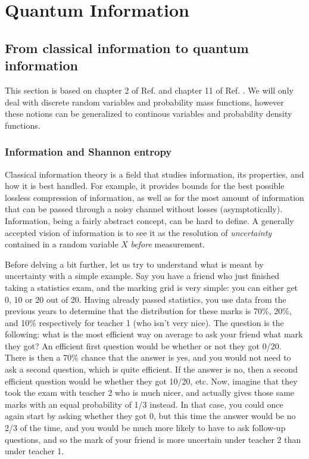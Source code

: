 \chapter{Quantum Information}

\section{From classical information to quantum information} \label{sec:classical_information}

This section is based on chapter 2 of Ref. \cite{cover_elements_2006} and chapter 11 of Ref. \cite{nielsen_quantum_2010}. We will only deal with discrete random variables and probability mass functions, however these notions can be generalized to continous variables and probability density functions.

\subsection{Information and Shannon entropy}

Classical information theory is a field that studies information, its properties, and how it is best handled. For example, it provides bounds for the best possible lossless compression of information, as well as for the most amount of information that can be passed through a noisy channel without losses (asymptotically). Information, being a fairly abstract concept, can be hard to define. A generally accepted vision of information is to see it as the resolution of \textit{uncertainty} contained in a random variable $X$ \textit{before} measurement.

Before delving a bit further, let us try to understand what is meant by uncertainty with a simple example. Say you have a friend who just finished taking a statistics exam, and the marking grid is very simple: you can either get 0, 10 or 20 out of 20. Having already passed statistics, you use data from the previous years to determine that the distribution for these marks is 70\%, 20\%, and 10\% respectively for teacher 1 (who isn't very nice). The question is the following: what is the most efficient way on average to ask your friend what mark they got? An efficient first question would be whether or not they got 0/20. There is then a 70\% chance that the answer is yes, and you would not need to ask a second question, which is quite efficient. If the answer is no, then a second efficient question would be whether they got 10/20, etc. Now, imagine that they took the exam with teacher 2 who is much nicer, and actually gives those same marks with an equal probability of 1/3 instead. In that case, you could once again start by asking whether they got 0, but this time the answer would be no 2/3 of the time, and you would be much more likely to have to ask follow-up questions, and so the mark of your friend is more uncertain under teacher 2 than under teacher 1.


